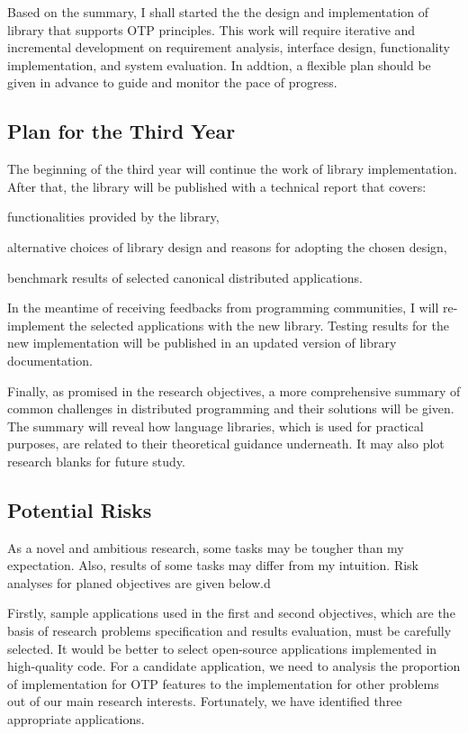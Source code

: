 Based on the summary, I shall started the the design and implementation of library that supports OTP principles.  This work will require iterative and incremental development on requirement analysis, interface design, functionality implementation, and system evaluation.  In addtion, a flexible plan should be given in advance to guide and monitor the pace of progress.

\subsection{Plan for the Third Year}
The beginning of the third year will continue the work of library implementation. After that, the library will be published with a technical report that covers:  
\begin{inparaenum}[(i)]
  \item functionalities provided by the library,
  \item alternative choices of library design and reasons for adopting the chosen design,
  \item benchmark results of selected canonical distributed applications.
\end{inparaenum}  

In the meantime of receiving feedbacks from programming communities, I will re-implement the selected applications with the new library.  Testing results for the new implementation will be published in an updated version of library documentation.

Finally, as promised in the research objectives, a more comprehensive summary of common challenges in distributed programming and their solutions will be given.  The summary will reveal how language libraries, which is used for practical purposes, are related to their theoretical guidance underneath.  It may also plot research blanks for future study.


\subsection{Potential Risks}
As a novel and ambitious research, some tasks may be tougher than my expectation.  Also, results of some tasks may differ from my intuition.  Risk analyses for planed objectives are given below.d

Firstly, sample applications used in the first and second objectives, which are the basis of research problems specification and results evaluation, must be carefully selected.  It would be better to select open-source applications implemented in high-quality code.  For a candidate application, we need to analysis the proportion of implementation for OTP features to the implementation for other problems out of our main research interests.  Fortunately, we have identified three appropriate applications.

